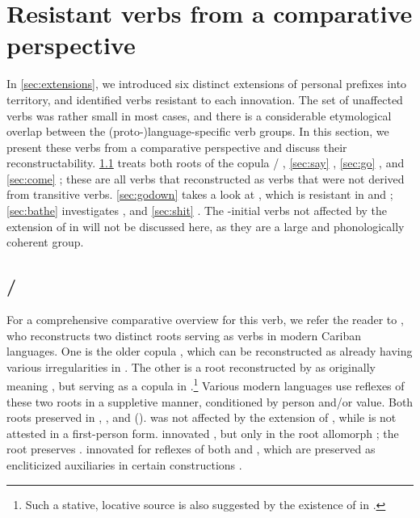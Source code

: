 \section{Resistant verbs from a comparative perspective}
\label{sec:verbs}
In \cref{sec:extensions}, we introduced six distinct extensions of personal prefixes into  territory, and identified verbs resistant to each innovation.
The set of unaffected verbs was rather small in most cases, and there is a considerable etymological overlap between the (proto-)language-specific verb groups.
In this section, we present these verbs from a comparative perspective and discuss their reconstructability.
\cref{sec:be} treats both roots of the copula / , \cref{sec:say}  , \cref{sec:go}  , and \cref{sec:come}  ; these are all verbs that \textcite{gildea2007greenberg} reconstructed as  verbs that were not derived from transitive verbs.
\cref{sec:godown} takes a look at  , which is resistant in \PTir and \PPek; \cref{sec:bathe} investigates \PPek {} , and \cref{sec:shit} \trio {}. %
The -initial verbs not affected by the extension of  in \akuriyo {} will not be discussed here, as they are a large and phonologically coherent group.

\subsection{/ }
\label{sec:be}
For a comprehensive comparative overview for this verb, we refer the reader to \textcite[375--382]{gildea2018reconstructing}, who reconstructs two distinct roots serving as verbs  in modern Cariban languages.
One is the older copula , which can be reconstructed as already having various irregularities in \PC.
The other is a root  reconstructed by \textcites{meira2009property}{gildea2018reconstructing} as originally meaning , but serving as a copula in \PC.\footnote{Such a stative, locative source is also suggested by the existence of   in \arara \parencite[196]{alves2017arara}.}
Various modern languages use reflexes of these two roots in a suppletive manner, conditioned by person and\slash{}or  value.
Both roots preserved   in \PPek, \PWai, and \PTir ().
\akuriyo {} was not affected by the extension of  , while  is not attested in a first-person form. 
\carijo innovated , but only in the  root allomorph ; the  root preserves  .
\yukpa innovated  for reflexes of both  and , which are preserved as encliticized auxiliaries in certain constructions .

